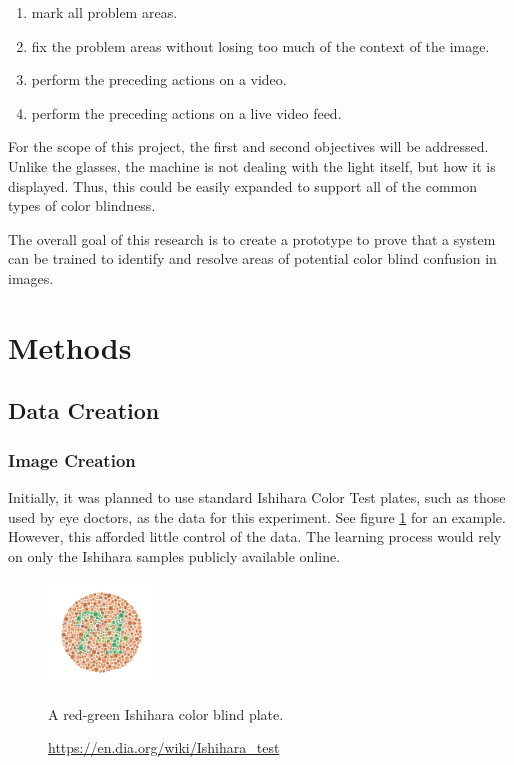 \documentclass[12pt]{article}
\begin{document}
\begin{multicols}{2}
\begin{enumerate}
	\item mark all problem areas.
	\item fix the problem areas without losing too much of the context of the image.
	\item perform the preceding actions on a video.
	\item perform the preceding actions on a live video feed.
\end{enumerate}


For the scope of this project, the first and second objectives will be addressed. Unlike the glasses, the machine is not dealing with the light itself, but how it is displayed. Thus, this could be easily expanded to support all of the common types of color blindness. 

The overall goal of this research is to create a prototype to prove that a system can be trained to identify and resolve areas of potential color blind confusion in images.


\section{Methods}

\subsection{Data Creation}
\subsubsection{Image Creation}
Initially, it was planned to use standard Ishihara Color Test plates, such as those used by eye doctors, as the data for this experiment. See figure \ref{fig:ishi} for an example. However, this afforded little control of the data. The learning process would rely on only the Ishihara samples publicly available online. 

\begin{figure}[H]
	\centering
	\includegraphics[width=0.25\textwidth]{img/Ishihara}
	\caption{A red-green Ishihara color blind plate.}
	\caption*{\href{https://en.dia.org/wiki/Ishihara\_test}{https://en.dia.org/wiki/Ishihara\_test}}
	\label{fig:ishi}
\end{figure}



\end{multicols}
\end{document}
